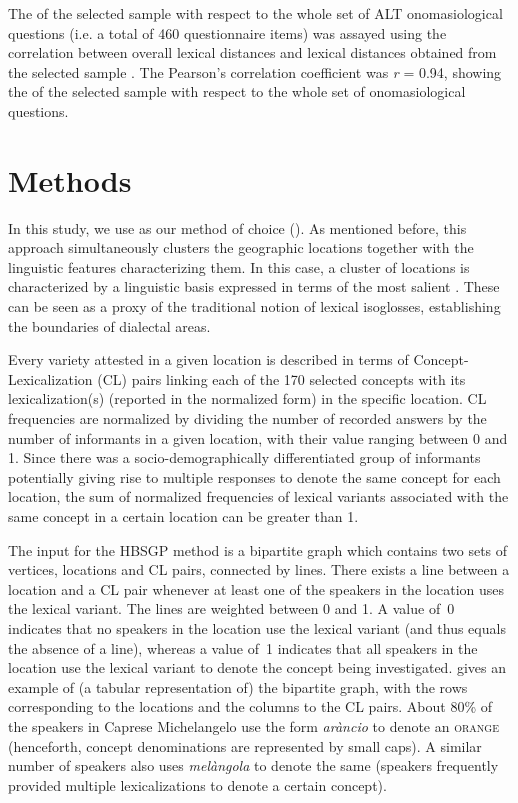 \documentclass[output=paper]{LSP/langsci}
\begin{document}
The  of the selected sample with respect to the whole set of ALT onomasiological questions (i.e. a total of 460 questionnaire items) was assayed using the correlation between overall lexical distances and lexical distances obtained from the selected sample \citep{wieling_analyzing_2014}. The Pearson’s correlation coefficient was \textit{r} = 0.94, showing the  of the selected sample with respect to the whole set of onomasiological questions.

\section{Methods}
In this study, we use  as our method of choice (\cite{wieling_bipartite_2011}). As mentioned before, this approach simultaneously clusters the geographic locations together with the linguistic features characterizing them. In this case, a cluster of locations is characterized by a linguistic basis expressed in terms of the most salient . These  can be seen as a proxy of the traditional notion of lexical isoglosses, establishing the boundaries of dialectal areas.

Every variety attested in a given location is described in terms of Concept-Lexicalization (CL) pairs linking each of the 170 selected concepts with its lexicalization(s) (reported in the normalized form) in the specific location. CL frequencies are normalized by dividing the number of recorded answers by the number of informants in a given location, with their value ranging between 0 and 1. Since there was a socio-demographically differentiated group of informants potentially giving rise to multiple responses to denote the same concept for each location, the sum of normalized frequencies of lexical variants associated with the same concept in a certain location can be greater than 1.

The input for the HBSGP method is a bipartite graph which contains two sets of vertices, locations and CL pairs, connected by lines. There exists a line between a location and a CL pair whenever at least one of the speakers in the location uses the lexical variant. The lines are weighted between 0 and 1. A value of~0 indicates that no speakers in the location use the lexical variant (and thus equals the absence of a line), whereas a value of~1 indicates that all speakers in the location use the lexical variant to denote the concept being investigated.  gives an example of (a tabular representation of) the bipartite graph, with the rows corresponding to the locations and the columns to the CL pairs. About 80\% of the speakers in Caprese Michelangelo use the form \textit{aràncio} to denote an \textsc{orange} (henceforth, concept denominations are represented by small caps). A similar number of speakers also uses \textit{melàngola} to denote the same (speakers frequently provided multiple lexicalizations to denote a certain concept). 
\end{document}
